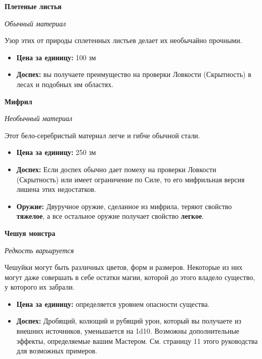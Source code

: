 \documentclass[a4paper, 9pt, twocolumn]{book}
\begin{document}
	\noindent \textbf{Плетеные листья} %
	
	\noindent \textit{Обычный материал}
	
	\smallskip
	
	\noindent Узор этих от природы сплетенных листьев делает их необычайно прочными.
	
	\begin{itemize}
		\item \textbf{Цена за единицу:} 100 зм
		
		\item \textbf{Доспех:} вы получаете преимущество на проверки Ловкости (Скрытность) в лесах и подобных им областях.
	\end{itemize}

	\noindent \textbf{Мифрил}
	
	\noindent \textit{Необычный материал}
	
	\smallskip
	
	\noindent Этот бело-серебристый материал легче и гибче обычной стали.
	
	\begin{itemize}
		\item \textbf{Цена за единицу:} 250 зм
		
		\item \textbf{Доспех:} Если доспех обычно дает помеху на проверки Ловкости (Скрытность) или имеет ограничение по Силе, то его мифрильная версия лишена этих недостатков.
		
		\item \textbf{Оружие:} Двуручное оружие, сделанное из мифрила, теряют свойство \textbf{тяжелое}, а все остальное оружие получает свойство \textbf{легкое}.
	\end{itemize}

	\noindent \textbf{Чешуя монстра}
	
	\noindent \textit{Редкость варьируется}
	
	\smallskip
	
	\noindent Чешуйки могут быть различных цветов, форм и размеров. Некоторые из них могут даже совершать в себе остатки магии, которой до этого владело существо, у которого их забрали.
	
	\begin{itemize}
		\item \textbf{Цена за единицу:} определяется уровнем опасности существа.
		
		\item \textbf{Доспех:} Дробящий, колющий и рубящий урон, который вы получаете из внешних источников, уменьшается на 1d10. Возможны дополнительные эффекты, определяемые вашим Мастером. См. страницу 11 этого руководства для возможных примеров. %
	\end{itemize}
\end{document}
